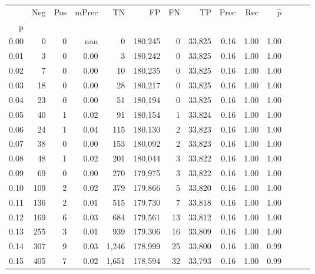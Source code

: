 \begin{tabular}{rrrrrrrrrrrrrr}
\toprule
{} &    Neg &    Pos & mPrec &       TN &       FP &      FN &      TP &  Prec &   Rec & $\hat{p}$ \\
p    &        &        &       &          &          &         &         &       &       &           \\
\midrule
0.00 &      0 &      0 &   nan &        0 &  180,245 &       0 &  33,825 &  0.16 &  1.00 &      1.00 \\
0.01 &      3 &      0 &  0.00 &        3 &  180,242 &       0 &  33,825 &  0.16 &  1.00 &      1.00 \\
0.02 &      7 &      0 &  0.00 &       10 &  180,235 &       0 &  33,825 &  0.16 &  1.00 &      1.00 \\
0.03 &     18 &      0 &  0.00 &       28 &  180,217 &       0 &  33,825 &  0.16 &  1.00 &      1.00 \\
0.04 &     23 &      0 &  0.00 &       51 &  180,194 &       0 &  33,825 &  0.16 &  1.00 &      1.00 \\
0.05 &     40 &      1 &  0.02 &       91 &  180,154 &       1 &  33,824 &  0.16 &  1.00 &      1.00 \\
0.06 &     24 &      1 &  0.04 &      115 &  180,130 &       2 &  33,823 &  0.16 &  1.00 &      1.00 \\
0.07 &     38 &      0 &  0.00 &      153 &  180,092 &       2 &  33,823 &  0.16 &  1.00 &      1.00 \\
0.08 &     48 &      1 &  0.02 &      201 &  180,044 &       3 &  33,822 &  0.16 &  1.00 &      1.00 \\
0.09 &     69 &      0 &  0.00 &      270 &  179,975 &       3 &  33,822 &  0.16 &  1.00 &      1.00 \\
0.10 &    109 &      2 &  0.02 &      379 &  179,866 &       5 &  33,820 &  0.16 &  1.00 &      1.00 \\
0.11 &    136 &      2 &  0.01 &      515 &  179,730 &       7 &  33,818 &  0.16 &  1.00 &      1.00 \\
0.12 &    169 &      6 &  0.03 &      684 &  179,561 &      13 &  33,812 &  0.16 &  1.00 &      1.00 \\
0.13 &    255 &      3 &  0.01 &      939 &  179,306 &      16 &  33,809 &  0.16 &  1.00 &      1.00 \\
0.14 &    307 &      9 &  0.03 &    1,246 &  178,999 &      25 &  33,800 &  0.16 &  1.00 &      0.99 \\
0.15 &    405 &      7 &  0.02 &    1,651 &  178,594 &      32 &  33,793 &  0.16 &  1.00 &      0.99 \\

\end{tabular}
